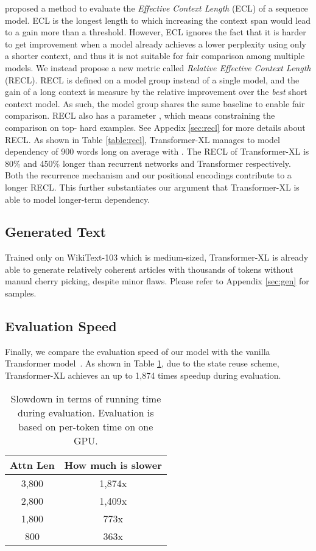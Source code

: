 \documentclass[11pt,a4paper]{article}
\begin{document}
\citet{khandelwal2018sharp} proposed a method to evaluate the \textit{Effective Context Length} (ECL) of a sequence model.
ECL is the longest length to which increasing the context span would lead to a gain more than a threshold.
However, ECL ignores the fact that it is harder to get improvement when a model already achieves a lower perplexity using only a shorter context, and thus it is not suitable for fair comparison among multiple models. We instead propose a new metric called \textit{Relative Effective Context Length} (RECL). RECL is defined on a model group instead of a single model, and the gain of a long context is measure by the relative improvement over the \textit{best} short context model. As such, the model group shares the same baseline to enable fair comparison. RECL also has a parameter , which means constraining the comparison on top- hard examples. See Appedix \ref{sec:recl} for more details about RECL. As shown in Table \ref{table:recl}, Transformer-XL manages to model dependency of 900 words long on average with . The RECL of Transformer-XL is 80\% and 450\% longer than recurrent networks and Transformer respectively. Both the recurrence mechanism and our positional encodings contribute to a longer RECL. This further substantiates our argument that Transformer-XL is able to model longer-term dependency.

\subsection{Generated Text}

Trained only on WikiText-103 which is medium-sized, Transformer-XL is already able to generate relatively coherent articles with thousands of tokens without manual cherry picking, despite minor flaws. Please refer to Appendix \ref{sec:gen} for samples.


\subsection{Evaluation Speed} \label{sec:speed}
Finally, we compare the evaluation speed of our model with the vanilla Transformer model~\cite{al2018character}. As shown in Table \ref{table:speed}, due to the state reuse scheme, Transformer-XL achieves an up to 1,874 times speedup during evaluation.

\begin{table}[t]
	\small
	\centering
	\begin{tabular}{cc}
		\toprule
		\bf Attn Len & \bf How much \citet{al2018character} is slower \\
		\midrule
		3,800 & 1,874x \\
		2,800 & 1,409x \\
		1,800 & 773x \\
		800 & 363x \\
		\bottomrule
	\end{tabular}
	\caption{\small
		Slowdown in terms of running time during evaluation. Evaluation is based on per-token time on one GPU.
	}
	\label{table:speed}
\end{table}
\end{document}
